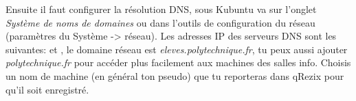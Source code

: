 Ensuite il faut configurer la résolution DNS, sous Kubuntu va sur l'onglet \textit{Système de noms de domaines} ou dans l'outils de configuration du réseau
(paramètres du Système -> réseau). Les adresses IP des serveurs DNS sont les suivantes:  et , le domaine réseau
est \textit{eleves.polytechnique.fr}, tu peux aussi ajouter \textit{polytechnique.fr} pour accéder plus facilement aux machines des salles info. Choisis un nom de machine
(en général ton pseudo) que tu reporteras dans qRezix pour qu'il soit enregistré.
% 
% 
% 
% 
